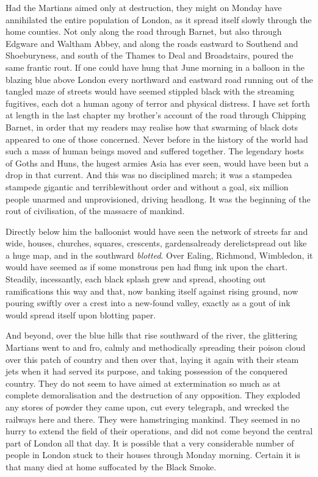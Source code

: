 Had the Martians aimed only at destruction, they might on Monday
have annihilated the entire population of London, as it spread
itself slowly through the home counties. Not only along the road
through Barnet, but also through Edgware and Waltham Abbey, and
along the roads eastward to Southend and Shoeburyness, and south of
the Thames to Deal and Broadstairs, poured the same frantic rout.
If one could have hung that June morning in a balloon in the
blazing blue above London every northward and eastward road running
out of the tangled maze of streets would have seemed stippled black
with the streaming fugitives, each dot a human agony of terror and
physical distress. I have set forth at length in the last chapter
my brother's account of the road through Chipping Barnet, in order
that my readers may realise how that swarming of black dots
appeared to one of those concerned. Never before in the history of
the world had such a mass of human beings moved and suffered
together. The legendary hosts of Goths and Huns, the hugest armies
Asia has ever seen, would have been but a drop in that current. And
this was no disciplined march; it was a stampede\dash{}a stampede
gigantic and terrible\dash{}without order and without a goal, six
million people unarmed and unprovisioned, driving headlong. It was
the beginning of the rout of civilisation, of the massacre of
mankind.

Directly below him the balloonist would have seen the network of
streets far and wide, houses, churches, squares, crescents,
gardens\dash{}already derelict\dash{}spread out like a huge map, and in the
southward \emph{blotted}. Over Ealing, Richmond, Wimbledon, it
would have seemed as if some monstrous pen had flung ink upon the
chart. Steadily, incessantly, each black splash grew and spread,
shooting out ramifications this way and that, now banking itself
against rising ground, now pouring swiftly over a crest into a
new-found valley, exactly as a gout of ink would spread itself upon
blotting paper.

And beyond, over the blue hills that rise southward of the river,
the glittering Martians went to and fro, calmly and methodically
spreading their poison cloud over this patch of country and then
over that, laying it again with their steam jets when it had served
its purpose, and taking possession of the conquered country. They
do not seem to have aimed at extermination so much as at complete
demoralisation and the destruction of any opposition. They exploded
any stores of powder they came upon, cut every telegraph, and
wrecked the railways here and there. They were hamstringing
mankind. They seemed in no hurry to extend the field of their
operations, and did not come beyond the central part of London all
that day. It is possible that a very considerable number of people
in London stuck to their houses through Monday morning. Certain it
is that many died at home suffocated by the Black Smoke.

